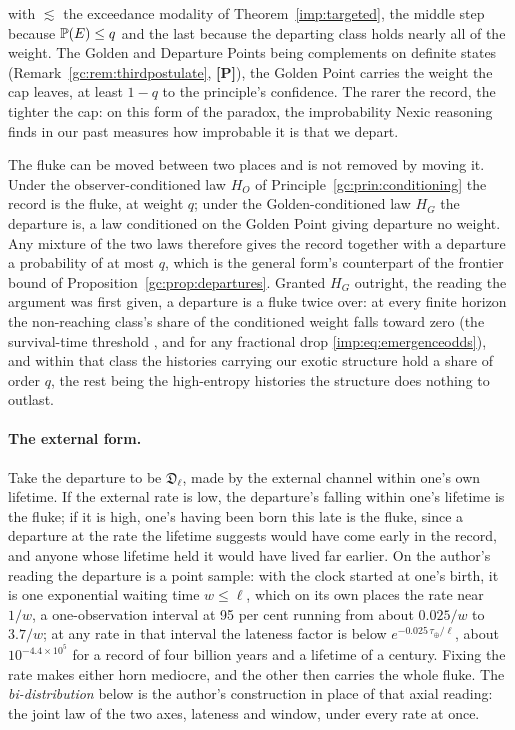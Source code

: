 with $\lesssim$ the exceedance modality of Theorem~\ref{imp:targeted},
the middle step because $\mathbb{P}(E)\le q$ and the last because the departing
class holds nearly all of the weight. The Golden and Departure Points
being complements on definite states
(Remark~\ref{gc:rem:thirdpostulate}, \textbf{[P]}), the Golden Point
carries the weight the cap leaves, at least $1-q$ to the principle's
confidence. The rarer the record, the tighter the cap: on this form of
the paradox, the improbability Nexic reasoning finds in our past
measures how improbable it is that we depart.

The fluke can be moved between two places and is not removed by moving
it. Under the observer-conditioned law $H_O$ of
Principle~\ref{gc:prin:conditioning} the record is the fluke, at weight
$q$; under the Golden-conditioned law $H_G$ the departure is, a law
conditioned on the Golden Point giving departure no weight. Any mixture
of the two laws therefore gives the record together with a departure a
probability of at most $q$, which is the general form's counterpart of
the frontier bound of Proposition~\ref{gc:prop:departures}. Granted
$H_G$ outright, the reading the argument was first given, a
departure is a fluke twice over: at every finite horizon the
non-reaching class's share of the conditioned weight falls toward zero
(the survival-time threshold \cite{GoldenTechnoanatomy}, and for any
fractional drop \eqref{imp:eq:emergenceodds}), and within that class the
histories carrying our exotic structure hold a share of order $q$, the
rest being the high-entropy histories the structure does nothing to
outlast.

\paragraph{The external form.}\label{gc:par:departuresexternal}
Take the departure to be $\mathfrak D_\ell$, made by the external
channel within one's own lifetime. If the external rate is low, the
departure's falling within one's lifetime is the fluke; if it is high,
one's having been born this late is the fluke, since a departure at the
rate the lifetime suggests would have come early in the record, and
anyone whose lifetime held it would have lived far earlier. On the
author's reading the departure is a point sample: with the clock started
at one's birth, it is one exponential waiting time $w\le\ell$, which on
its own places the rate near $1/w$, a one-observation interval at
95 per cent running from about $0.025/w$ to $3.7/w$; at any rate in that
interval the lateness factor is below $e^{-0.025\,\tau_\oplus/\ell}$, about
$10^{-4.4\times10^{5}}$ for a record of four billion years and a lifetime
of a century. Fixing the rate makes either horn mediocre, and the other
then carries the whole fluke. The \emph{bi-distribution} below is the
author's construction in place of that axial reading: the joint law of
the two axes, lateness and window, under every rate at once.

